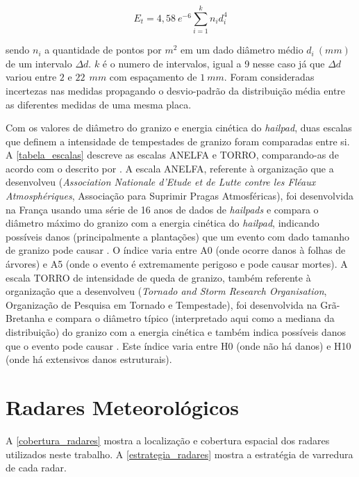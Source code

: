 \begin{equation} \label{mezeix}
	E_t = 4,58\:e^{-6} \sum_{i=1}^{k} n_i d_i^4
\end{equation}

\noindent
sendo $n_i$ a quantidade de pontos por $m^2$ em um dado diâmetro médio $d_i\:(mm)$ de um intervalo $\Delta d$. $k$ é o numero de intervalos, igual a 9 nesse caso já que $\Delta d$ variou entre $2$ e $22\:\:mm$ com espaçamento de $1\:mm$. Foram consideradas incertezas nas medidas propagando o desvio-padrão da distribuição média entre as diferentes medidas de uma mesma placa.

Com os valores de diâmetro do granizo e energia cinética do \textit{hailpad}, duas escalas que definem a intensidade de tempestades de granizo foram comparadas entre si. A \autoref{tabela_escalas} descreve as escalas ANELFA e TORRO, comparando-as de acordo com o descrito por . A escala ANELFA, referente à organização que a desenvolveu (\textit{Association Nationale d'Etude et de Lutte contre les Fléaux Atmosphériques}, Associação para Suprimir Pragas Atmosféricas), foi desenvolvida na França usando uma série de 16 anos de dados de \textit{hailpads} e compara o diâmetro máximo do granizo com a energia cinética do \textit{hailpad}, indicando possíveis danos (principalmente a plantações) que um evento com dado tamanho de granizo pode causar \cite{Dessens2007}. O índice varia entre A0 (onde ocorre danos à folhas de árvores) e A5 (onde o evento é extremamente perigoso e pode causar mortes). A escala TORRO de intensidade de queda de granizo, também referente à organização que a desenvolveu (\textit{Tornado and Storm Research Organisation}, Organização de Pesquisa em Tornado e Tempestade), foi desenvolvida na Grã-Bretanha e compara o diâmetro típico (interpretado aqui como a mediana da distribuição) do granizo com a energia cinética e também indica possíveis danos que o evento pode causar \cite{webb1986}. Este índice varia entre H0 (onde não há danos) e H10 (onde há extensivos danos estruturais).



\section{Radares Meteorológicos}\label{radar}

A \autoref{cobertura_radares} mostra a localização e cobertura espacial dos radares utilizados neste trabalho. A \autoref{estrategia_radares} mostra a estratégia de varredura de cada radar.

